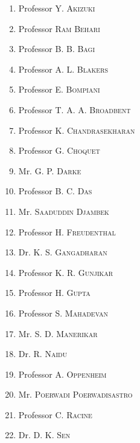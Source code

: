\begin{enumerate}
\itemsep=2pt
\item Professor \textsc{Y. Akizuki}

\item Professor \textsc{Ram Behari}

\item Professor \textsc{B. B. Bagi}

\item Professor \textsc{A. L. Blakers}

\item Professor \textsc{E. Bompiani}

\item Professor \textsc{T. A. A. Broadbent}

\item Professor \textsc{K. Chandrasekharan}

\item Professor \textsc{G. Choquet}

\item Mr. \textsc{G. P. Darke}

\item Professor \textsc{B. C. Das}

\item Mr. \textsc{Saaduddin Djambek}

\item Professor \textsc{H. Freudenthal}

\item Dr. \textsc{K. S. Gangadharan}

\item Professor \textsc{K. R. Gunjikar}

\item Professor \textsc{H. Gupta}

\item Professor \textsc{S. Mahadevan}

\item Mr. \textsc{S. D. Manerikar}

\item Dr. \textsc{R. Naidu}

\item Professor \textsc{A. Oppenheim}

\item Mr. \textsc{Poerwadi Poerwadisastro}

\item Professor \textsc{C. Racine}

\item Dr. \textsc{D. K. Sen}


\end{enumerate}
